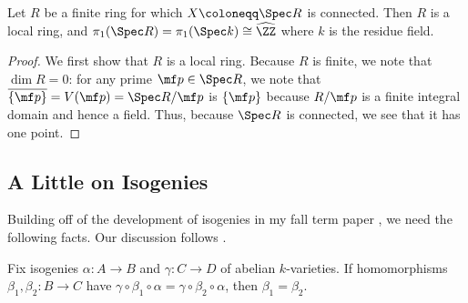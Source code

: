 \documentclass{amsart}
\begin{document}
\begin{proposition}
    Let $R$ be a finite ring for which $X\coloneqq\Spec R$ is connected. Then $R$ is a local ring, and $\pi_1(\Spec R)=\pi_1(\Spec k)\cong\widehat\ZZ$ where $k$ is the residue field.
\end{proposition}
\begin{proof}
    We first show that $R$ is a local ring. Because $R$ is finite, we note that $\dim R=0$: for any prime $\mf p\in\Spec R$, we note that $\overline{\{\mf p\}}=V(\mf p)=\Spec R/\mf p$ is $\{\mf p\}$ because $R/\mf p$ is a finite integral domain and hence a field. Thus, because $\Spec R$ is connected, we see that it has one point.
\end{proof}

\subsection{A Little on Isogenies}
Building off of the development of isogenies in my fall term paper \cite[Section~2.3]{elber-av}, we need the following facts. Our discussion follows \cite{egm-av}.
\begin{lemma} \label{lem:cancel-isos}
	Fix isogenies $\alpha\colon A\to B$ and $\gamma\colon C\to D$ of abelian $k$-varieties. If homomorphisms $\beta_1,\beta_2\colon B\to C$ have $\gamma\circ\beta_1\circ\alpha=\gamma\circ\beta_2\circ\alpha$, then $\beta_1=\beta_2$.
\end{lemma}
\end{document}
